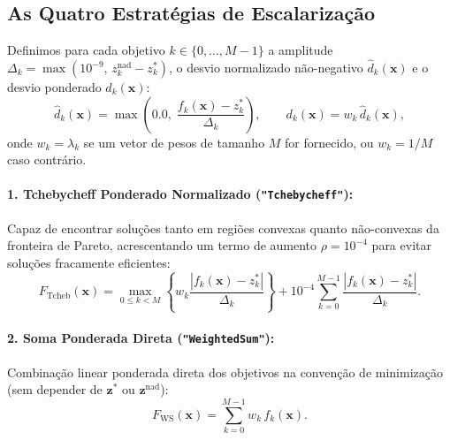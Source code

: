 \documentclass[11pt,a4paper]{article}
\begin{document}
\subsection{As Quatro Estratégias de Escalarização}

Definimos para cada objetivo $k \in \{0, \dots, M-1\}$ a amplitude $\Delta_k = \max(10^{-9},\, z^{\text{nad}}_k - z^*_k)$, o desvio normalizado não-negativo $\hat{d}_k(\mathbf{x})$ e o desvio ponderado $d_k(\mathbf{x})$:
\begin{equation}
  \hat{d}_k(\mathbf{x}) = \max\!\left(0.0,\; \frac{f_k(\mathbf{x}) - z^*_k}{\Delta_k}\right),
  \qquad
  d_k(\mathbf{x}) = w_k \, \hat{d}_k(\mathbf{x}),
  \label{eq:regret_norm}
\end{equation}
onde $w_k = \lambda_k$ se um vetor de pesos de tamanho $M$ for fornecido, ou $w_k = 1/M$ caso contrário.

\paragraph{1. Tchebycheff Ponderado Normalizado (\texttt{"Tchebycheff"}):}
Capaz de encontrar soluções tanto em regiões convexas quanto não-convexas da fronteira de Pareto, acrescentando um termo de aumento $\rho = 10^{-4}$ para evitar soluções fracamente eficientes:
\begin{equation}
  F_{\text{Tcheb}}(\mathbf{x}) = \max_{0 \le k < M} \left\{ w_k \frac{|f_k(\mathbf{x}) - z^*_k|}{\Delta_k} \right\}
  + 10^{-4} \sum_{k=0}^{M-1} \frac{|f_k(\mathbf{x}) - z^*_k|}{\Delta_k}.
  \label{eq:tcheb}
\end{equation}

\paragraph{2. Soma Ponderada Direta (\texttt{"WeightedSum"}):}
Combinação linear ponderada direta dos objetivos na convenção de minimização (sem depender de $\mathbf{z}^*$ ou $\mathbf{z}^{\text{nad}}$):
\begin{equation}
  F_{\text{WS}}(\mathbf{x}) = \sum_{k=0}^{M-1} w_k \, f_k(\mathbf{x}).
  \label{eq:ws}
\end{equation}
\end{document}
